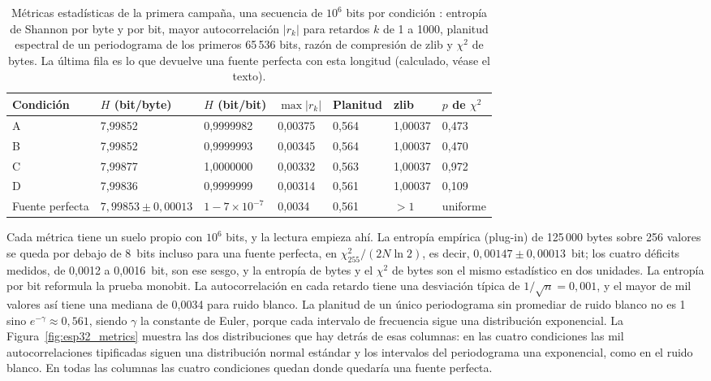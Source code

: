 \begin{table}[htbp]
\centering
\caption{Métricas estadísticas de la primera campaña, una secuencia de
$10^6$ bits por condición \meas{}: entropía de Shannon por byte y por bit,
mayor autocorrelación $|r_k|$ para retardos $k$ de 1 a 1000, planitud
espectral de un periodograma de los primeros 65\,536 bits, razón de
compresión de zlib y $\chi^2$ de bytes. La última fila es lo que devuelve
una fuente perfecta con esta longitud (calculado, véase el texto).}
\label{tab:esp32_entropy}
\footnotesize
\begin{tabular}{@{}lllllll@{}}
\toprule
Condición & $H$ (bit/byte) & $H$ (bit/bit) & $\max|r_k|$ & Planitud & zlib & $p$ de $\chi^2$ \\
\midrule
A & 7,99852 & 0,9999982 & 0,00375 & 0,564 & 1,00037 & 0,473 \\
B & 7,99852 & 0,9999993 & 0,00345 & 0,564 & 1,00037 & 0,470 \\
C & 7,99877 & 1,0000000 & 0,00332 & 0,563 & 1,00037 & 0,972 \\
D & 7,99836 & 0,9999999 & 0,00314 & 0,561 & 1,00037 & 0,109 \\
\midrule
Fuente perfecta & $7{,}99853 \pm 0{,}00013$ & $1 - 7\times10^{-7}$ & 0,0034 & 0,561 & $>1$ & uniforme \\
\bottomrule
\end{tabular}
\end{table}

Cada métrica tiene un suelo propio con $10^6$ bits, y la lectura empieza
ahí. La entropía empírica (plug-in) de 125\,000 bytes sobre 256 valores
se queda por debajo de 8~bits incluso para una fuente perfecta, en
$\chi^2_{255}/(2N\ln 2)$, es decir, $0{,}00147 \pm 0{,}00013$~bit; los
cuatro déficits medidos, de 0,0012 a 0,0016~bit, son ese sesgo, y la
entropía de bytes y el $\chi^2$ de bytes son el mismo estadístico en dos
unidades. La entropía por bit reformula la prueba monobit. La
autocorrelación en cada retardo tiene una desviación típica de
$1/\sqrt{n} = 0{,}001$, y el mayor de mil valores así tiene una mediana de
0,0034 para ruido blanco. La planitud de un único periodograma sin
promediar de ruido blanco no es 1 sino $e^{-\gamma} \approx 0{,}561$,
siendo $\gamma$ la constante de Euler, porque cada intervalo de
frecuencia sigue una distribución exponencial. La
Figura~\ref{fig:esp32_metrics} muestra las dos distribuciones que hay
detrás de esas columnas: en las cuatro condiciones las mil
autocorrelaciones tipificadas siguen una distribución normal estándar y
los intervalos del periodograma una exponencial, como en el ruido blanco.
En todas las columnas las cuatro condiciones quedan donde quedaría una
fuente perfecta.

